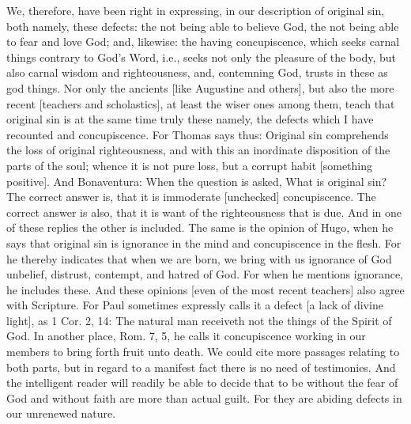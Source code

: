 We, therefore, have been right in expressing, in our description of
original sin, both namely, these defects: the not being able to
believe God, the not being able to fear and love God; and, likewise:
the having concupiscence, which seeks carnal things contrary to God's
Word, i.e., seeks not only the pleasure of the body, but also carnal
wisdom and righteousness, and, contemning God, trusts in these as god
things.  Nor only the ancients [like Augustine and others], but also
the more recent [teachers and scholastics], at least the wiser ones
among them, teach that original sin is at the same time truly these
namely, the defects which I have recounted and concupiscence.  For
Thomas says thus: Original sin comprehends the loss of original
righteousness, and with this an inordinate disposition of the parts
of the soul; whence it is not pure loss, but a corrupt habit
[something positive].  And Bonaventura: When the question is asked,
What is original sin?  The correct answer is, that it is immoderate
[unchecked] concupiscence.  The correct answer is also, that it is
want of the righteousness that is due.  And in one of these replies
the other is included.  The same is the opinion of Hugo, when he says
that original sin is ignorance in the mind and concupiscence in the
flesh.  For he thereby indicates that when we are born, we bring with
us ignorance of God unbelief, distrust, contempt, and hatred of God.
For when he mentions ignorance, he includes these.  And these
opinions [even of the most recent teachers] also agree with Scripture.
For Paul sometimes expressly calls it a defect [a lack of divine
light], as 1 Cor. 2, 14: The natural man receiveth not the things of
the Spirit of God.  In another place, Rom. 7, 5, he calls it
concupiscence working in our members to bring forth fruit unto death.
We could cite more passages relating to both parts, but in regard to
a manifest fact there is no need of testimonies.  And the intelligent
reader will readily be able to decide that to be without the fear of
God and without faith are more than actual guilt.  For they are
abiding defects in our unrenewed nature.

